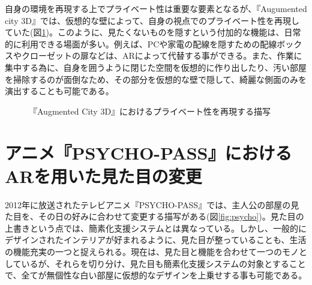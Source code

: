 自身の環境を再現する上でプライベート性は重要な要素となるが、『Augumented city 3D』では、仮想的な壁によって、自身の視点でのプライベート性を再現していた(図\ref{fig:arcity03})。このように、見たくないものを隠すという付加的な機能は、日常的に利用できる場面が多い。例えば、PCや家電の配線を隠すための配線ボックスやクローゼットの扉などは、ARによって代替する事ができる。また、作業に集中する為に、自身を囲うように閉じた空間を仮想的に作り出したり、汚い部屋を掃除するのが面倒なため、その部分を仮想的な壁で隠して、綺麗な側面のみを演出することも可能である。

\begin{figure}[htbp]
  \begin{minipage}{0.5\hsize}
    \begin{center}
    \end{center}
  \end{minipage}
  \begin{minipage}{0.5\hsize}
    \begin{center}
    \end{center}
  \end{minipage}
  \caption{『Augmented City 3D』におけるプライベート性を再現する描写}
  \label{fig:arcity03}
\end{figure}


\section{アニメ『PSYCHO-PASS』におけるARを用いた見た目の変更}

2012年に放送されたテレビアニメ『PSYCHO-PASS』\cite{psycopass}では、主人公の部屋の見た目を、その日の好みに合わせて変更する描写がある(図\ref{fig:psycho})。見た目の上書きという点では、簡素化支援システムとは異なっている。しかし、一般的にデザインされたインテリアが好まれるように、見た目が整っていることも、生活の機能充実の一つと捉えられる。現在は、見た目と機能を合わせて一つのモノとしているが、それらを切り分け、見た目も簡素化支援システムの対象とすることで、全てが無個性な白い部屋に仮想的なデザインを上乗せする事も可能である。

